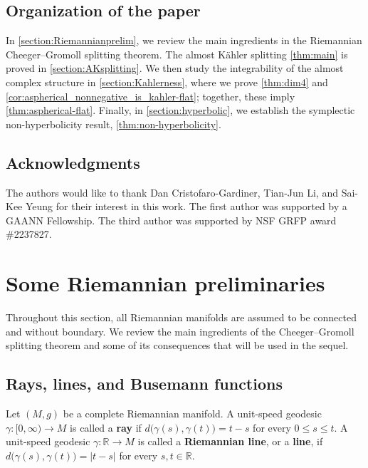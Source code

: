 \documentclass[11pt,twoside]{amsart}
\begin{document}
\subsection*{Organization of the paper}
In \autoref{section:Riemannianprelim}, we review the main ingredients in the Riemannian Cheeger--Gromoll splitting theorem. The almost K\"ahler splitting \autoref{thm:main} is proved in \autoref{section:AKsplitting}. We then study the integrability of the almost complex structure in \autoref{section:Kahlerness}, where we prove \autoref{thm:dim4} and \autoref{cor:aspherical_nonnegative_is_kahler-flat}; together, these imply \autoref{thm:aspherical-flat}. Finally, in \autoref{section:hyperbolic}, we establish the symplectic non-hyperbolicity result, \autoref{thm:non-hyperbolicity}.


\subsection*{Acknowledgments} The authors would like to thank Dan Cristofaro-Gardiner, Tian-Jun Li, and Sai-Kee Yeung for their interest in this work. The first author was supported by a GAANN Fellowship. The third author was supported by NSF GRFP award \#2237827.

\section{Some Riemannian preliminaries}\label{section:Riemannianprelim}

Throughout this section, all Riemannian manifolds are assumed to be connected and without boundary.  We review the main ingredients of the Cheeger--Gromoll splitting theorem and some of its consequences that will be used in the sequel.

\subsection{Rays, lines, and Busemann functions}

\begin{definition}
Let $(M,g)$ be a complete Riemannian manifold.
A unit-speed geodesic
$
    \gamma\colon [0,\infty)\longrightarrow M
$
is called a {\bf ray} if
\(
    d\bigl(\gamma(s),\gamma(t)\bigr)=t-s
\)
for every $0\leq s\leq t$.
A unit-speed geodesic
$
    \gamma\colon \mathbb{R}\longrightarrow M
$
is called a {\bf Riemannian line}, or a {\bf line}, if
\(
    d\bigl(\gamma(s),\gamma(t)\bigr)=|t-s|
\)
for every $s,t\in\mathbb{R}$.
\end{definition}
\end{document}
